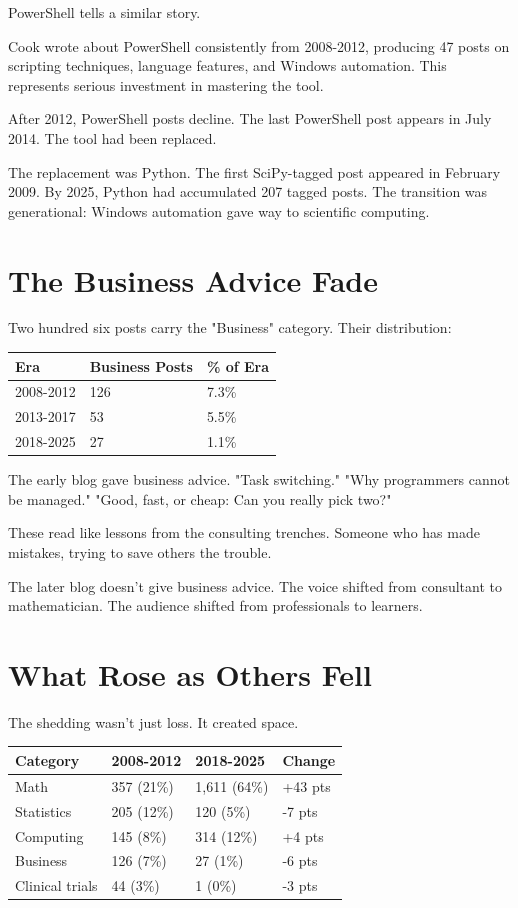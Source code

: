 PowerShell tells a similar story.

Cook wrote about PowerShell consistently from 2008-2012, producing 47 posts on scripting techniques, language features, and Windows automation. This represents serious investment in mastering the tool.

After 2012, PowerShell posts decline. The last PowerShell post appears in July 2014. The tool had been replaced.

The replacement was Python. The first SciPy-tagged post appeared in February 2009. By 2025, Python had accumulated 207 tagged posts. The transition was generational: Windows automation gave way to scientific computing.

\bigskip

\section*{The Business Advice Fade}

Two hundred six posts carry the "Business" category. Their distribution:

\begin{longtable}{p{3.00cm}p{3.00cm}p{3.00cm}}
\toprule
\textbf{Era} & \textbf{Business Posts} & \textbf{\% of Era} \tabularnewline
\midrule
2008-2012 & 126 & 7.3\% \tabularnewline
2013-2017 & 53 & 5.5\% \tabularnewline
2018-2025 & 27 & 1.1\% \tabularnewline
\bottomrule
\end{longtable}

The early blog gave business advice. "Task switching." "Why programmers cannot be managed." "Good, fast, or cheap: Can you really pick two?"

These read like lessons from the consulting trenches. Someone who has made mistakes, trying to save others the trouble.

The later blog doesn't give business advice. The voice shifted from consultant to mathematician. The audience shifted from professionals to learners.

\bigskip

\section*{What Rose as Others Fell}

The shedding wasn't just loss. It created space.

\begin{longtable}{p{2.25cm}p{2.25cm}p{2.25cm}p{2.25cm}}
\toprule
\textbf{Category} & \textbf{2008-2012} & \textbf{2018-2025} & \textbf{Change} \tabularnewline
\midrule
Math & 357 (21\%) & 1,611 (64\%) & +43 pts \tabularnewline
Statistics & 205 (12\%) & 120 (5\%) & -7 pts \tabularnewline
Computing & 145 (8\%) & 314 (12\%) & +4 pts \tabularnewline
Business & 126 (7\%) & 27 (1\%) & -6 pts \tabularnewline
Clinical trials & 44 (3\%) & 1 (0\%) & -3 pts \tabularnewline
\bottomrule
\end{longtable}


